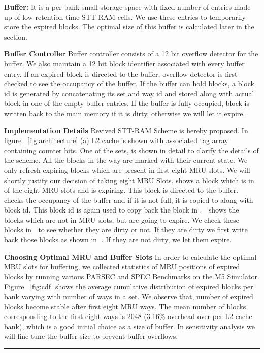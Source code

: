 \noindent\textbf{Buffer:}
It is a per bank small storage space with fixed number of entries made up of low-retention time STT-RAM cells. We use these entries to temporarily store the expired blocks. The optimal size of this buffer is calculated later in the section.

\noindent\textbf{Buffer Controller}
Buffer controller consists of a 12 bit overflow detector for the buffer. We also maintain a 12 bit block identifier associated with every buffer entry. If an expired block is directed to the buffer, overflow detector is first checked to see the occupancy of the buffer. If the buffer can hold blocks, a block id is generated by concatenating its set and way id and stored along with actual block in one of the empty buffer entries. If the buffer is fully occupied, block is written back to the main memory if it is dirty, otherwise we will let it expire.  

\noindent\textbf{Implementation Details}
Revived STT-RAM Scheme is hereby proposed. In figure ~\ref{fig:architecture} (a) L2 cache is shown with associated tag array containing counter bits.  One of the sets, is shown in detail to clarify the details of the scheme.  All the blocks in the way are marked with their current state. We only refresh expiring blocks which are present in first eight MRU slots. We will shortly justify our decision of taking eight MRU Slots.  shows a block which is in of the eight MRU slots and is expiring. This block is directed to the buffer.  checks the occupancy of the buffer and if it is not full, it is copied to  along with block id. This block id is again used to copy back the block in  . \textcircled{\raisebox{-.9pt}{A}} shows the blocks which are not in MRU slots, but are going to expire. We check these blocks in \textcircled{\raisebox{-.9pt}{B}}  to see whether they are dirty or not. If they are dirty we first write back those blocks as shown in \textcircled{\raisebox{-.9pt}{C}}.  If they are not dirty, we let them expire.


\noindent\textbf{Choosing Optimal MRU and Buffer Slots}
In order to calculate the optimal MRU slots for buffering, we collected statistics of MRU positions of expired blocks by running various PARSEC and SPEC Benchmarks on the M5 Simulator. 
Figure ~\ref{fig:cdf} shows the average cumulative distribution of expired blocks per bank varying with number of ways in a set. We observe that, number of expired blocks become stable after first eight MRU ways. The mean number of blocks corresponding to the first eight ways is 2048 (3.16\% overhead over per L2 cache bank), which is a good initial choice as a size of buffer. In sensitivity analysis we will fine tune the buffer size to prevent buffer overflows. 


\begin{figure*} [t]
\centering
 \hrule
 \caption{\label{fig:cdf} \scriptsize \bf CDF}
\end{figure*}


